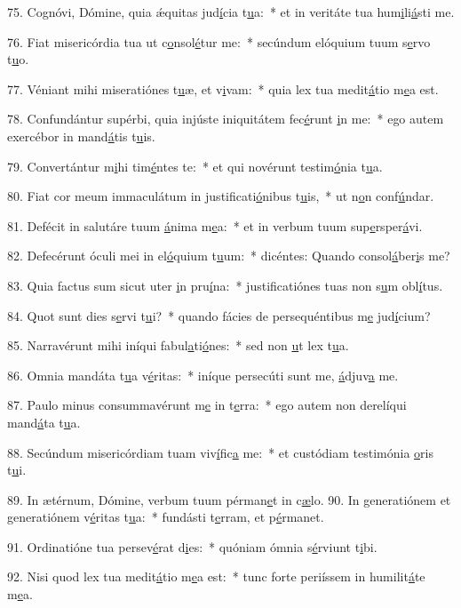 75. Cognóvi, Dómine, quia ǽquitas jud\uline{í}cia t\uline{u}a:~* et in veritáte tua hum\uline{i}li\uline{á}sti me.\par 
76. Fiat misericórdia tua ut c\uline{o}nsol\uline{é}tur me:~* secúndum elóquium tuum s\uline{e}rvo t\uline{u}o.\par 
77. Véniant mihi miseratiónes t\uline{u}æ, et v\uline{i}vam:~* quia lex tua medit\uline{á}tio m\uline{e}a est.\par 
78. Confundántur supérbi, quia injúste iniquitátem fec\uline{é}runt \uline{i}n me:~* ego autem exercébor in mand\uline{á}tis t\uline{u}is.\par 
79. Convertántur m\uline{i}hi tim\uline{é}ntes te:~* et qui novérunt testim\uline{ó}nia t\uline{u}a.\par 
80. Fiat cor meum immaculátum in justificati\uline{ó}nibus t\uline{u}is,~* ut n\uline{o}n conf\uline{ú}ndar.\par 
81. Defécit in salutáre tuum \uline{á}nima m\uline{e}a:~* et in verbum tuum sup\uline{e}rsper\uline{á}vi.\par 
82. Defecérunt óculi mei in el\uline{ó}quium t\uline{u}um:~* dicéntes: Quando consol\uline{á}ber\uline{i}s me?\par 
83. Quia factus sum sicut uter \uline{i}n pru\uline{í}na:~* justificatiónes tuas non s\uline{u}m obl\uline{í}tus.\par 
84. Quot sunt dies s\uline{e}rvi t\uline{u}i?~* quando fácies de persequéntibus m\uline{e} jud\uline{í}cium?\par 
85. Narravérunt mihi iníqui fabul\uline{a}ti\uline{ó}nes:~* sed non \uline{u}t lex t\uline{u}a.\par 
86. Omnia mandáta t\uline{u}a v\uline{é}ritas:~* iníque persecúti sunt me, \uline{á}djuv\uline{a} me.\par 
87. Paulo minus consummavérunt m\uline{e} in t\uline{e}rra:~* ego autem non derelíqui mand\uline{á}ta t\uline{u}a.\par 
88. Secúndum misericórdiam tuam viv\uline{í}fic\uline{a} me:~* et custódiam testimónia \uline{o}ris t\uline{u}i.\par 
89. In ætérnum, Dómine, verbum tuum pérman\uline{e}t in c\uline{æ}lo.
90. In generatiónem et generatiónem v\uline{é}ritas t\uline{u}a:~* fundásti t\uline{e}rram, et p\uline{é}rmanet.\par 
91. Ordinatióne tua persev\uline{é}rat d\uline{i}es:~* quóniam ómnia s\uline{é}rviunt t\uline{i}bi.\par 
92. Nisi quod lex tua medit\uline{á}tio m\uline{e}a est:~* tunc forte periíssem in humilit\uline{á}te m\uline{e}a.\par 
